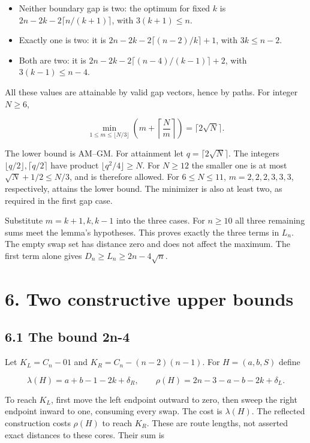 \documentclass[11pt,a4paper]{article}
\providecommand{\tightlist}{\setlength{\itemsep}{0pt}\setlength{\parskip}{0pt}}
\begin{document}
\begin{itemize}
\tightlist
\item
  Neither boundary gap is two: the optimum for fixed \(k\) is \(2n-2k-2\lceil n/(k+1)\rceil\), with \(3(k+1)\le n\).
\item
  Exactly one is two: it is \(2n-2k-2\lceil(n-2)/k\rceil+1\), with \(3k\le n-2\).
\item
  Both are two: it is \(2n-2k-2\lceil(n-4)/(k-1)\rceil+2\), with \(3(k-1)\le n-4\).
\end{itemize}

All these values are attainable by valid gap vectors, hence by paths. For integer \(N\ge6\),

\[\min_{1\le m\le\lfloor N/3\rfloor}
\left(m+\left\lceil\frac Nm\right\rceil\right)=\lceil2\sqrt N\rceil.\]

The lower bound is AM--GM. For attainment let \(q=\lceil2\sqrt N\rceil\). The integers \(\lfloor q/2\rfloor,\lceil q/2\rceil\) have product \(\lfloor q^2/4\rfloor\ge N\). For \(N\ge12\) the smaller one is at most \(\sqrt N+1/2\le N/3\), and is therefore allowed. For \(6\le N\le11\), \(m=2,2,2,3,3,3\), respectively, attains the lower bound. The minimizer is also at least two, as required in the first gap case.

Substitute \(m=k+1,k,k-1\) into the three cases. For \(n\ge10\) all three remaining sums meet the lemma's hypotheses. This proves exactly the three terms in \(L_n\). The empty swap set has distance zero and does not affect the maximum. The first term alone gives \(D_n\ge L_n\ge2n-4\sqrt n\).

\hypertarget{two-constructive-upper-bounds}{%
\section{6. Two constructive upper bounds}\label{two-constructive-upper-bounds}}

\hypertarget{the-bound-2n-4}{%
\subsection{6.1 The bound 2n-4}\label{the-bound-2n-4}}

Let \(K_L=C_n-01\) and \(K_R=C_n-(n-2)(n-1)\). For \(H=(a,b,S)\) define

\[ \lambda(H)=a+b-1-2k+\delta_R,\qquad
\rho(H)=2n-3-a-b-2k+\delta_L. \]

To reach \(K_L\), first move the left endpoint outward to zero, then sweep the right endpoint inward to one, consuming every swap. The cost is \(\lambda(H)\). The reflected construction costs \(\rho(H)\) to reach \(K_R\). These are route lengths, not asserted exact distances to these cores. Their sum is
\end{document}
